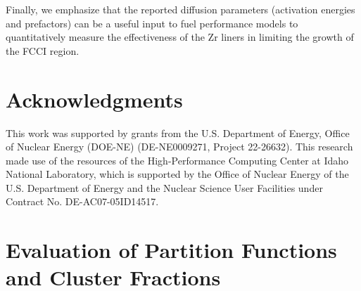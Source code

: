 \documentclass[preprint,12pt]{elsarticle}
\begin{document}
Finally, we emphasize that the reported diffusion parameters (activation energies and prefactors) can be a useful input to fuel performance models to quantitatively measure the effectiveness of the Zr liners in limiting the growth of the FCCI region. 

\FloatBarrier
\section{Acknowledgments}

This work was supported by grants from the U.S. Department of Energy, Office of Nuclear Energy (DOE-NE) (DE-NE0009271, Project 22-26632). This research made use of the resources of the High-Performance Computing Center at Idaho National Laboratory, which is supported by the Office of Nuclear Energy of the U.S. Department of Energy and the Nuclear Science User Facilities under Contract No. DE-AC07-05ID14517.

\appendix

\section{Evaluation of Partition Functions and Cluster Fractions}
\label{appendix_partition}
\end{document}
